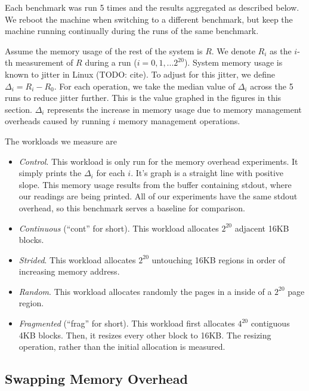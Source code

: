 \documentclass[twocolumn,11pt]{article}
\begin{document}
Each benchmark was run 5 times and the results aggregated as described below. We
reboot the machine when switching to a different benchmark, but keep the machine
running continually during the runs of the same benchmark. 

Assume the memory usage of the rest of the system is $R$. We denote $R_i$ as the
$i$-th measurement of $R$ during a run ($i = 0, 1, ... 2^{20}$). System memory
usage is known to jitter in Linux (TODO: cite). To adjust for this jitter, we
define $\Delta_i = R_i - R_0$. For each operation, we take the median value of
$\Delta_i$ across the 5 runs to reduce jitter further.  This is the value
graphed in the figures in this section. $\Delta_i$ represents the increase in
memory usage due to memory management overheads caused by running $i$ memory
management operations.

The workloads we measure are

\begin{itemize} \item \textit{Control}. This workload is only run for the memory
overhead experiments. It simply prints the $\Delta_i$ for each $i$. It's graph
is a straight line with positive slope. This memory usage results from the
buffer containing stdout, where our readings are being printed. All of our
experiments have the same stdout overhead, so this benchmark serves a baseline
for comparison.

\item \textit{Continuous} (``cont'' for short). This workload allocates $2^{20}$
adjacent 16KB blocks.

\item \textit{Strided}. This workload allocates $2^{20}$ untouching 16KB regions
in order of increasing memory address.

\item \textit{Random}. This workload allocates randomly the pages in a
inside of a $2^{20}$ page region.

\item \textit{Fragmented} (``frag'' for short). This workload first allocates
    $4^{20}$ contiguous 4KB blocks. Then, it resizes every other block to 16KB.
        The resizing operation, rather than the initial allocation is measured.
\end{itemize}

\subsection{Swapping Memory Overhead}
\end{document}
